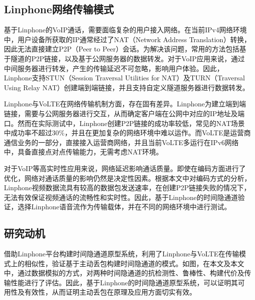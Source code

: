 \subsection{Linphone网络传输模式}
\label{chap:linphone:motivation:net}

基于Linphone的VoIP通话，需要面临复杂的用户接入网络。在当前IPv4网络环境中，用户设备所获取的IP通常经过了NAT（Network Address Translation）转换，因此无法直接建立P2P（Peer to Peer）会话。为解决该问题，常用的方法包括基于隧道的P2P链接，以及基于公网服务器的数据转发。对于VoIP应用来说，通过中间服务器进行转发，产生的传输延迟不可忽略，影响用户体验。因此，Linphone支持STUN（Session Traversal Utilities for NAT）及TURN（Traversal Using Relay NAT）创建端到端链接，并且支持自定义隧道服务器进行数据转发。

Linphone与VoLTE在网络传输机制方面，存在固有差异。Linphone为建立端到端链接，需要与公网服务器进行交互，从而确定客户端在公网中对应的IP地址及端口。然而在实际测试中，Linphone创建P2P链接的成功率较低，常见的NAT场景中成功率不超过30\%，并且在更加复杂的网络环境中难以运作。而VoLTE是运营商通信业务的一部分，直接接入运营商网络，并且当前VoLTE多运行在IPv6网络中，具备直接点对点传输能力，无需考虑NAT环境。

对于VoIP等高实时性应用来说，网络延迟影响通话质量。即使在编码方面进行了优化，网络对通话质量的影响仍然是决定性因素。根据本文中对编码方式的分析，Linphone视频数据流具有较高的数据包发送速率，在创建P2P链接失败的情况下，无法有效保证视频通话的流畅性和实时性。因此，基于Linphone的时间隐通道验证，选择Linphone语音流作为传输载体，并在不同的网络环境中进行测试。

\subsection{研究动机}
\label{chap:linphone:motivation:sum}


借助Linphone平台构建时间隐通道原型系统，利用了Linphone与VoLTE在传输模式上的相似性，验证基于主动丢包构建时间隐通道的模式。如图，在本文及本文中，通过数据模拟的方式，对两种时间隐通道的抗检测性、鲁棒性、构建代价及传输性能进行了评估。因此，基于Linphone的时间隐通道原型系统，可以证明其可用性及有效性，从而证明主动丢包在原理及应用方面切实有效。